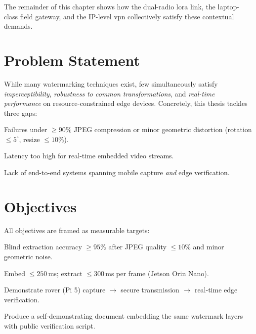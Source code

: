 \bigskip
The remainder of this chapter shows how the dual-radio \gls{lora} link, the
laptop-class field gateway, and the IP-level \gls{vpn} collectively satisfy
these contextual demands.

\section{Problem Statement}
\label{sec:intro:problem}

While many watermarking techniques exist, few simultaneously satisfy
\emph{imperceptibility}, \emph{robustness to common transformations},
and \emph{real-time performance} on resource-constrained edge devices.
Concretely, this thesis tackles three gaps:

\begin{description}[leftmargin=3.6cm,style=sameline]
  \item[\textbf{Robustness bottleneck}] Failures under $\ge 90\%$ JPEG compression or minor geometric distortion (rotation $\le 5^{\circ}$, resize $\le 10\%$).
  \item[\textbf{Performance gap}] Latency too high for real-time embedded video streams.
  \item[\textbf{Integration gap}] Lack of end-to-end systems spanning mobile capture \emph{and} edge verification.
\end{description}

\section{Objectives}
\label{sec:intro:objectives}

All objectives are framed as measurable targets:

\begin{description}[leftmargin=3.2cm,style=sameline]
  \item[O1 Robustness] Blind extraction accuracy $\ge 95\%$ after JPEG quality $\le 10\%$ and minor geometric noise.
  \item[O2 Latency] Embed $\le 250$\,ms; extract $\le 300$\,ms per frame (Jetson Orin Nano).
  \item[O3 Integration] Demonstrate rover (Pi 5) capture $\rightarrow$ secure transmission $\rightarrow$ real-time edge verification.
  \item[O4 Verifiability] Produce a self-demonstrating document embedding the same watermark layers with public verification script.
\end{description}

